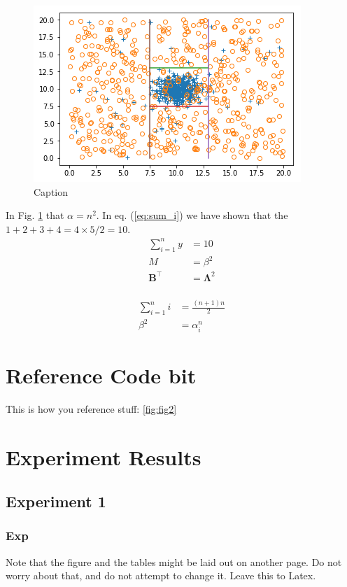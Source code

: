 \documentclass{svproc}
\begin{document}
    
    \begin{figure}
        \centering
        \includegraphics[scale=.75]{figures/DecisionBoundary.png}
        \caption{Caption}
        \label{fig:my_label}
    \end{figure}


    
    In Fig. \ref{fig:my_label} that $\alpha = n^2$. In eq. (\ref{eq:sum_i}) we have shown that the $ 1+2+3+4 = 4\times 5 /2=10$.
    \begin{align*}
        \sum_{i=1}^{n} y &= 10 \\
        M &= \beta ^2 \\
        \boldsymbol{B}^\top &= \boldsymbol{\Lambda}^2 \\
    \end{align*}
    
    \begin{align}
        \label{eq:sum_i}
        \sum_{i=1}^n i &= \frac{(n+1)n}{2} \\  
        \nonumber
        \beta ^2 &= \alpha_i^n
    \end{align}

\section{Reference Code bit}
    This is how you reference stuff: \ref{fig:fig2}

\section{Experiment Results}
    \subsection{Experiment 1}
        \subsubsection{Exp}
    Note that the figure and the tables might be laid out on another page. Do not worry about that, and do not attempt to change it. Leave this to Latex.
    
\end{document}
